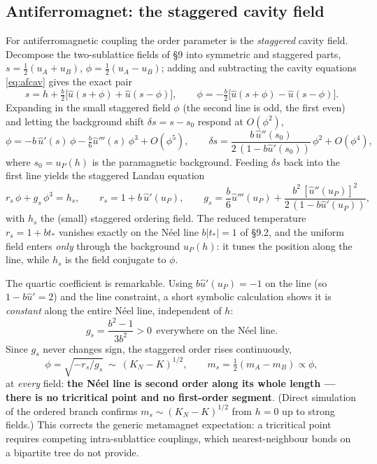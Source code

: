 \documentclass[11pt]{article}
\begin{document}
\subsection*{Antiferromagnet: the staggered cavity field}
For antiferromagnetic coupling the order parameter is the \emph{staggered} cavity field. Decompose the
two-sublattice fields of \S9 into symmetric and staggered parts, $s=\tfrac12(u_A+u_B)$,
$\phi=\tfrac12(u_A-u_B)$; adding and subtracting the cavity equations \eqref{eq:afcav} gives the exact
pair
\begin{equation*}
s=h+\tfrac{b}{2}\big[\hat u(s{+}\phi)+\hat u(s{-}\phi)\big],\qquad
\phi=-\tfrac{b}{2}\big[\hat u(s{+}\phi)-\hat u(s{-}\phi)\big].
\end{equation*}
Expanding in the small staggered field $\phi$ (the second line is odd, the first even) and letting the
background shift $\delta s=s-s_0$ respond at $O(\phi^2)$,
\begin{equation*}
\phi=-b\,\hat u'(s)\,\phi-\tfrac{b}{6}\hat u'''(s)\,\phi^3+O(\phi^5),\qquad
\delta s=\frac{b\,\hat u''(s_0)}{2\,(1-b\hat u'(s_0))}\,\phi^2+O(\phi^4),
\end{equation*}
where $s_0=u_P(h)$ is the paramagnetic background. Feeding $\delta s$ back into the first line yields the
staggered Landau equation
\begin{equation}
r_s\,\phi+g_s\,\phi^3=h_s,\qquad
r_s=1+b\,\hat u'(u_P),\qquad
g_s=\frac{b}{6}\hat u'''(u_P)+\frac{b^2\,[\hat u''(u_P)]^2}{2\,(1-b\hat u'(u_P))},
\end{equation}
with $h_s$ the (small) staggered ordering field. The reduced temperature $r_s=1+bt_*$ vanishes exactly on
the N\'eel line $b|t_*|=1$ of \S9.2, and the uniform field enters \emph{only} through the background
$u_P(h)$: it tunes the position along the line, while $h_s$ is the field conjugate to $\phi$.

The quartic coefficient is remarkable. Using $b\hat u'(u_P)=-1$ on the line (so $1-b\hat u'=2$) and the
line constraint, a short symbolic calculation shows it is \emph{constant} along the entire N\'eel line,
independent of $h$:
\begin{equation}
\boxed{\;g_s=\frac{b^2-1}{3b^2}>0\ \ \text{everywhere on the N\'eel line.}\;}
\end{equation}
Since $g_s$ never changes sign, the staggered order rises continuously,
\begin{equation}
\phi=\sqrt{-r_s/g_s}\ \sim\ (K_N-K)^{1/2},\qquad m_s=\tfrac12(m_A-m_B)\propto\phi,
\end{equation}
at \emph{every} field: \textbf{the N\'eel line is second order along its whole length --- there is no
tricritical point and no first-order segment}. (Direct simulation of the ordered branch confirms
$m_s\sim(K_N{-}K)^{1/2}$ from $h=0$ up to strong fields.) This corrects the generic metamagnet
expectation: a tricritical point requires competing intra-sublattice couplings, which nearest-neighbour
bonds on a bipartite tree do not provide.
\end{document}
